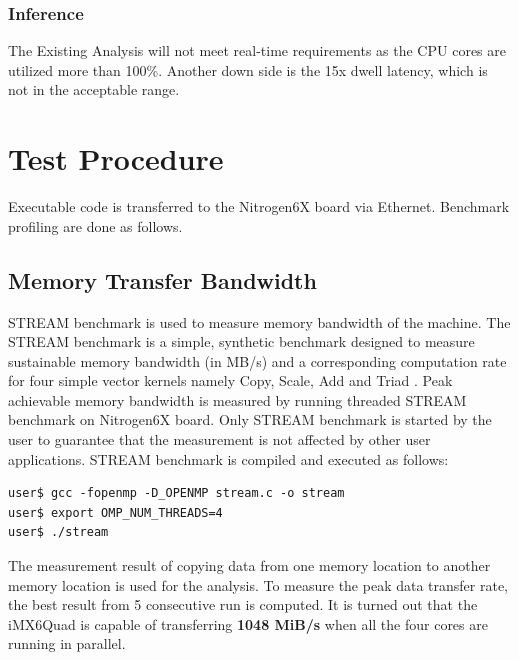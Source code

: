 \subsubsection{Inference}
The Existing Analysis will not meet real-time requirements as the CPU cores are utilized more than 100\%. Another down side is the 15x dwell latency, which is not in the acceptable range.
\section{Test Procedure} 
\label{sec:mm:test_procedure}
Executable code is transferred to the Nitrogen6X board via Ethernet. Benchmark profiling are done as follows.

\subsection{Memory Transfer Bandwidth}
\label{ss:mm:mem_bw}
STREAM benchmark\cite{McCalpin2007} is used to measure memory bandwidth of the machine. The STREAM benchmark is a simple, synthetic benchmark designed to measure sustainable memory bandwidth (in MB/s) and a corresponding computation rate for four simple vector kernels namely Copy, Scale, Add and Triad \cite{streamDef}. Peak achievable memory bandwidth is measured by running threaded STREAM benchmark on Nitrogen6X board. Only STREAM benchmark is started by the user to guarantee that the measurement is not affected by other user applications.  STREAM benchmark is compiled and executed as follows: \\


\begin{lstlisting}
user$ gcc -fopenmp -D_OPENMP stream.c -o stream
user$ export OMP_NUM_THREADS=4
user$ ./stream
\end{lstlisting}

The measurement result of copying data from one memory location to another memory location is used for the  analysis. To measure the peak data transfer rate, the best result from 5 consecutive run is computed. It is turned out that the iMX6Quad is capable of transferring \textbf{1048 MiB/s} when all the four cores are running in parallel.\\


